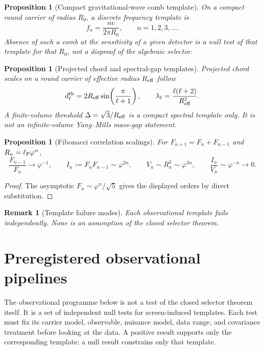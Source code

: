 \documentclass[11pt,a4paper]{article}
\newtheorem{proposition}[theorem]{Proposition}
\newtheorem{remark}[theorem]{Remark}
\newcommand{\ellP}{\ell_{\rm P}}
\begin{document}
\begin{proposition}[Compact gravitational-wave comb template]
On a compact round carrier of radius $R_0$, a discrete frequency template is
\[
f_n=\frac{nc}{2\pi R_0},
\qquad n=1,2,3,\dots.
\]
Absence of such a comb at the sensitivity of a given detector is a null test of that template for that $R_0$, not a disproof of the algebraic selector.
\end{proposition}

\begin{proposition}[Projected chord and spectral-gap templates]
Projected chord scales on a round carrier of effective radius $R_{\rm eff}$ follow
\[
d_\ell^{\rm th}=2R_{\rm eff}\sin\!\left(\frac{\pi}{\ell+1}\right),
\qquad
\lambda_\ell=\frac{\ell(\ell+2)}{R_{\rm eff}^2}.
\]
A finite-volume threshold $\Delta=\sqrt3/R_{\rm eff}$ is a compact spectral template only.  It is not an infinite-volume Yang--Mills mass-gap statement.
\end{proposition}

\begin{proposition}[Fibonacci correlation scalings]
For $F_{n+1}=F_n+F_{n-1}$ and $R_n=\ellP\varphi^n$,
\[
\frac{F_{n-1}}{F_n}\to\varphi^{-1},
\qquad
I_n:=F_nF_{n-1}\sim\varphi^{2n},
\qquad
V_n\sim R_n^3\sim\varphi^{3n},
\qquad
\frac{I_n}{V_n}\sim\varphi^{-n}\to0.
\]
\end{proposition}
\begin{proof}
The asymptotic $F_n\sim\varphi^n/\sqrt5$ gives the displayed orders by direct substitution.
\end{proof}

\begin{remark}[Template failure modes]
Each observational template fails independently.  None is an assumption of the closed selector theorem.
\end{remark}




\section{Preregistered observational pipelines}
\label{sec:preregistered-pipelines}

The observational programme below is not a test of the closed selector theorem itself.  It is a set of independent null tests for screen-induced templates.  Each test must fix its carrier model, observable, nuisance model, data range, and covariance treatment before looking at the data.  A positive result supports only the corresponding template; a null result constrains only that template.
\end{document}
